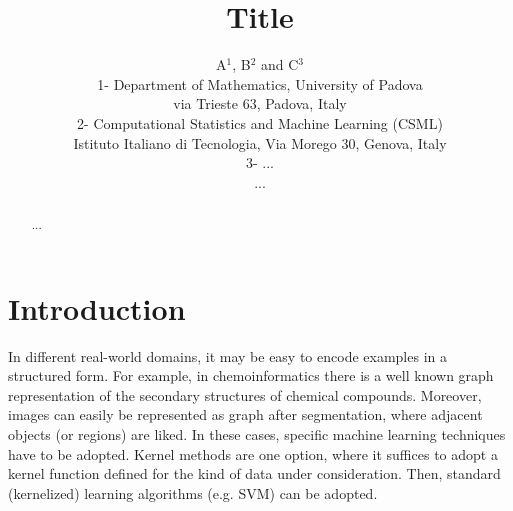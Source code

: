 \documentclass{esannV2}
\begin{document}
\title{Title}

\author{A$^1$, B$^2$ and C$^3$
%
%
\vspace{.3cm}\\
%
1- Department of Mathematics, University of Padova\\
via Trieste 63, Padova, Italy
\vspace{.1cm}\\
2- Computational Statistics and Machine Learning (CSML) \\
Istituto Italiano di Tecnologia, Via Morego 30, Genova, Italy
\vspace{.1cm}\\
3- ... \\
...
}

%

\maketitle


\begin{abstract}
...
\end{abstract}


\section{Introduction}
In different real-world domains, it may be easy to encode examples in a structured form. For example, in chemoinformatics there is a well known graph representation of the secondary structures of chemical compounds. Moreover, images can easily be represented as graph after segmentation, where adjacent objects (or regions) are liked.
In these cases, specific machine learning techniques have to be adopted.
Kernel methods are one option, where it suffices to adopt a kernel function defined for the kind of data under consideration. Then, standard (kernelized) learning algorithms (e.g. SVM) can be adopted.
\end{document}
